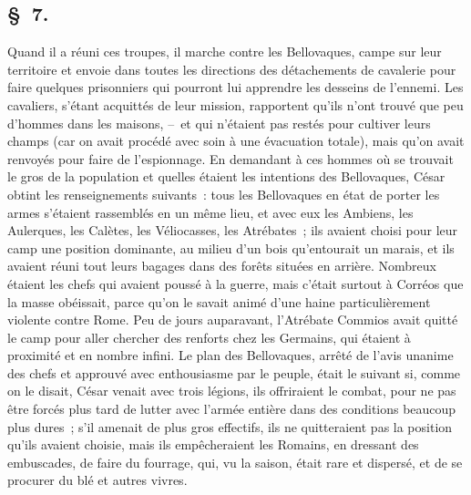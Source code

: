 \documentclass[french,twoside]{book} %
\begin{document}
\subsection[{§ 7.}]{ \textsc{§ 7.} }
\noindent Quand il a réuni ces troupes, il marche contre les Bellovaques, campe sur leur territoire et envoie dans toutes les directions des détachements de cavalerie pour faire quelques prisonniers qui pourront lui apprendre les desseins de l’ennemi. Les cavaliers, s’étant acquittés de leur mission, rapportent qu’ils n’ont trouvé que peu d’hommes dans les maisons, – et qui n’étaient pas restés pour cultiver leurs champs (car on avait procédé avec soin à une évacuation totale), mais qu’on avait renvoyés pour faire de l’espionnage. En demandant à ces hommes où se trouvait le gros de la population et quelles étaient les intentions des Bellovaques, César obtint les renseignements suivants : tous les Bellovaques en état de porter les armes s’étaient rassemblés en un même lieu, et avec eux les Ambiens, les Aulerques, les Calètes, les Véliocasses, les Atrébates ; ils avaient choisi pour leur camp une position dominante, au milieu d’un bois qu’entourait un marais, et ils avaient réuni tout leurs bagages dans des forêts situées en arrière. Nombreux étaient les chefs qui avaient poussé à la guerre, mais c’était surtout à Corréos que la masse obéissait, parce qu’on le savait animé d’une haine particulièrement violente contre Rome. Peu de jours auparavant, l’Atrébate Commios avait quitté le camp pour aller chercher des renforts chez les Germains, qui étaient à proximité et en nombre infini. Le plan des Bellovaques, arrêté de l’avis unanime des chefs et approuvé avec enthousiasme par le peuple, était le suivant si, comme on le disait, César venait avec trois légions, ils offriraient le combat, pour ne pas être forcés plus tard de lutter avec l’armée entière dans des conditions beaucoup plus dures ; s’il amenait de plus gros effectifs, ils ne quitteraient pas la position qu’ils avaient choisie, mais ils empêcheraient les Romains, en dressant des embuscades, de faire du fourrage, qui, vu la saison, était rare et dispersé, et de se procurer du blé et autres vivres.
\end{document}
